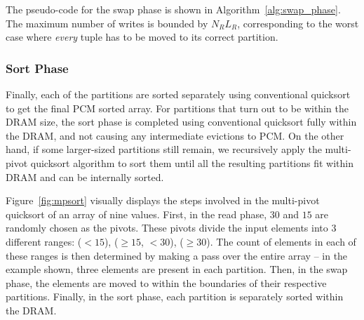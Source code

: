 The pseudo-code for the swap phase is shown in
Algorithm~\ref{alg:swap_phase}.  The maximum number of writes is bounded
by $N_R L_R$, corresponding to the worst case where \emph{every} tuple
has to be moved to its correct partition.




\subsubsection{Sort Phase}
Finally, each of the partitions are sorted separately using conventional
quicksort to get the final PCM sorted array. For partitions that turn
out to be within the DRAM size, the sort phase is completed using
conventional quicksort fully within the DRAM, and not causing any
intermediate evictions to PCM.  On the other hand, if some larger-sized
partitions still remain, we recursively apply the multi-pivot quicksort
algorithm to sort them until all the resulting partitions fit within DRAM 
and can be internally sorted.



Figure~\ref{fig:mpsort} visually displays the steps involved in the
multi-pivot quicksort of an array of nine values. First, in the read phase,
$30$ and $15$ are randomly chosen as the pivots. These pivots divide the input
elements into 3 different ranges: ($< 15$), ($\geq 15$, $< 30$), ($\geq
30$). The count of elements in each of these ranges is then determined by
making a pass over the entire array -- in the example shown, three elements
are present in each partition.  Then, in the swap phase, the elements are
moved to within the boundaries of their respective partitions. Finally,
in the sort phase, each partition is separately sorted within the DRAM.


